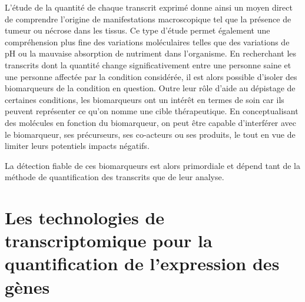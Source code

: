 L'étude de la quantité de chaque transcrit exprimé donne ainsi un moyen direct de comprendre l'origine de manifestations macroscopique tel que la présence de tumeur ou nécrose dans les tissus. Ce type d'étude permet également une compréhension plus fine des variations moléculaires telles que des variations de pH ou la mauvaise absorption de nutriment dans l'organisme. En recherchant les transcrits dont la quantité change significativement entre une personne saine et une personne affectée par la condition considérée, il est alors possible d'isoler des biomarqueurs de la condition en question. Outre leur rôle d'aide au dépistage de certaines conditions, les biomarqueurs ont un intérêt en termes de soin car ils peuvent représenter ce qu'on nomme une cible thérapeutique. En conceptualisant des molécules en fonction du biomarqueur, on peut être capable d'interférer avec le biomarqueur, ses précurseurs, ses co-acteurs ou ses produits, le tout en vue de limiter leurs potentiels impacts négatifs.


La détection fiable de ces biomarqueurs est alors primordiale et dépend tant de la méthode de quantification des transcrits que de leur analyse.



\section{Les technologies de transcriptomique pour la quantification de l'expression des gènes}

